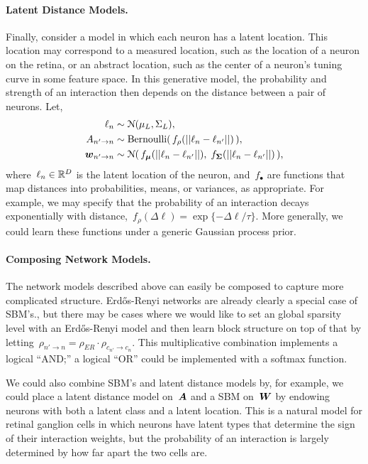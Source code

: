 \documentclass[aos]{imsart} %
\begin{document}
\paragraph{Latent Distance Models.} Finally, consider a model in which each neuron has a latent location. This location may correspond to a measured location, such as the location of a neuron on the retina, or an abstract location, such as the center of a neuron's tuning curve in some feature space. In this generative model, the probability and strength of an interaction then depends on the distance between a pair of neurons. Let,
\begin{align}
\ell_n &\sim \distNormal(\mu_L, \Sigma_L),\\
A_{n' \to n} &\sim \text{Bernoulli}(\,f_\rho(||\ell_n - \ell_{n'}||)\,), \\
\bw_{n' \to n} &\sim \distNormal(\,f_{\bmu}(||\ell_n - \ell_{n'}||),\; f_{\bSigma}(||\ell_n - \ell_{n'}||)\,),
\end{align}
where~${\ell_n\in \mathbb{R}^D}$ is the latent location of the neuron, and~${f_\bullet}$ are functions that map distances into probabilities, means, or variances, as appropriate. For example, we may specify that the probability of an interaction decays exponentially with distance,~${f_\rho(\Delta \ell)=\exp\{-\Delta \ell / \tau\}}$. More generally, we could learn these functions under a generic Gaussian process prior.

\paragraph{Composing Network Models.} The network models described above can easily be composed to capture more complicated structure.  Erd\H{o}s-Renyi networks are already clearly a special case of SBM's., but there may be cases where we would like to set an global sparsity level with an Erd\H{o}s-Renyi model and then learn block structure on top of that by letting~${\rho_{n'\to n}=\rho_{ER} \cdot \rho_{c_{n'}\to c_{n}}}$.  This multiplicative combination implements a logical ``AND;'' a logical ``OR'' could be implemented with a softmax function. 

We could also combine SBM's and latent distance models by, for example, we could place a latent distance model on~$\boldsymbol{A}$ and a SBM on~$\boldsymbol{W}$ by endowing neurons with both a latent class and a latent location. This is a natural model for retinal ganglion cells in which neurons have latent types that determine the sign of their interaction weights, but the probability of an interaction is largely determined by how far apart the two cells are. 
\end{document}

